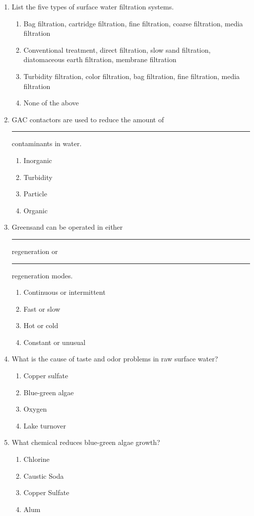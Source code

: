 \documentclass{article}
\begin{document}
\begin{enumerate}
\item List the five types of surface water filtration systems.
\begin{enumerate}
\item Bag filtration, cartridge filtration, fine filtration, coarse filtration, media filtration
\item Conventional treatment, direct filtration, slow sand filtration, diatomaceous
earth filtration, membrane filtration
\item Turbidity filtration, color filtration, bag filtration, fine filtration, media filtration
\item None of the above
\end{enumerate}

\item GAC contactors are used to reduce the amount of \rule{1cm}{0.5pt}  contaminants in water.
\begin{enumerate}
\item Inorganic
\item Turbidity
\item Particle
\item Organic
\end{enumerate}

\item Greensand can be operated in either \rule{1cm}{0.5pt}  regeneration or \rule{1cm}{0.5pt} regeneration modes.
\begin{enumerate}
\item Continuous or intermittent
\item Fast or slow
\item Hot or cold
\item Constant or unusual
\end{enumerate}

\item  What is the cause of taste and odor problems in raw surface water?\\
\begin{enumerate}
\item Copper sulfate\\
\item Blue-green algae\\
\item Oxygen\\
\item Lake turnover
\end{enumerate}

\item  What chemical reduces blue-green algae growth?\\
\begin{enumerate}
\item Chlorine\\
\item Caustic Soda\\
\item Copper Sulfate\\
\item Alum
\end{enumerate}



\end{enumerate}
\end{document}
